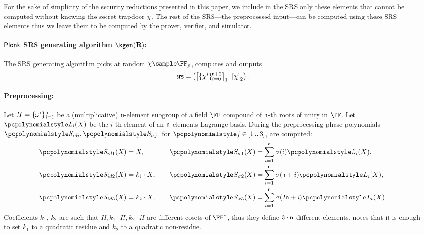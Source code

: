 \documentclass[runningheads,11pt]{llncs}
\theoremstyle{definition} \newtheorem{definition}[theorem]{Definition}
\begin{document}
For the sake of simplicity of the security reductions presented in this paper, we
include in the SRS only these elements that cannot be computed without knowing
the secret trapdoor $\chi$. The rest of the SRS---the preprocessed input---can
be computed using these SRS elements thus we leave them to be computed by the
prover, verifier, and simulator.

\paragraph{$\textnormal{\textsf{Plonk}}$ SRS generating algorithm $\kgen(\REL)$:}
The SRS generating algorithm picks at random $\chi \sample \FF_p$, computes
and outputs
\[
	\mathsf{srs} = \left(\left[\{\chi^i\}_{i = 0}^{\mathsf{n} + 2}\right]_{1},
	\left[\chi\right]_{2} \right).
\]

\paragraph{Preprocessing:}
Let $H = \{\omega^i\}_{i = 1}^{\mathsf{n} }$ be a
(multiplicative) $\mathsf{n}$-element subgroup of a field $\FF$
compound of $\mathsf{n}$-th roots of unity in $\FF$. Let $\lag_i(X)$ be
the $i$-th element of an $\mathsf{n}$-elements Lagrange basis. During
the preprocessing phase polynomials $\p{S_{id j}}, \p{S_{\sigma j}}$, for
$\p{j} \in \range{1}{3}$, are computed:
\begin{equation*}
  \begin{aligned}
    \p{S_{id 1}}(X) & = X,\vphantom{\sum_{i = 1}^{\noofc} \sigma(i) \lag_i(X),}\\
    \p{S_{id 2}}(X) & = k_1 \cdot X,\vphantom{\sum_{i = 1}^{\noofc} \sigma(i) \lag_i(X),}\\
    \p{S_{id 3}}(X) & = k_2 \cdot X,\vphantom{\sum_{i = 1}^{\noofc} \sigma(i) \lag_i(X),}
  \end{aligned}
  \qquad
\begin{aligned}
  \p{S_{\sigma 1}}(X) & = \sum_{i = 1}^{\noofc} \sigma(i) \lag_i(X),\\
  \p{S_{\sigma 2}}(X) & = \sum_{i = 1}^{\noofc}
  \sigma(\noofc + i) \lag_i(X),\\
  \p{S_{\sigma 3}}(X) & =\sum_{i = 1}^{\noofc} \sigma(2 \noofc + i) \lag_i(X).
\end{aligned}
\end{equation*}
Coefficients $k_1$, $k_2$ are such that $H, k_1 \cdot H, k_2 \cdot H$ are
different cosets of $\FF^*$, thus they define $3 \cdot \mathsf{n}$
different elements. \cite{EPRINT:GabWilCio19} notes that it is enough to set
$k_1$ to a quadratic residue and $k_2$ to a quadratic non-residue.
\end{document}
